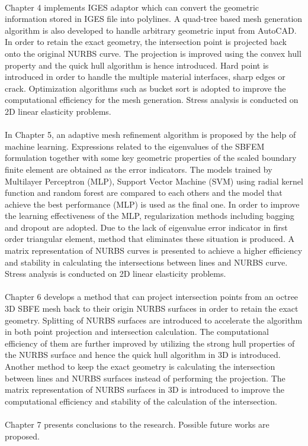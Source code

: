 \paragraph{}
Chapter 4 implements IGES adaptor which can convert the geometric information stored in IGES file into polylines.
A quad-tree based mesh generation algorithm is also developed to handle arbitrary geometric input from AutoCAD.
In order to retain the exact geometry, the intersection point is projected back onto the original NURBS curve.
The projection is improved using the convex hull property and the quick hull algorithm is hence introduced.
Hard point is introduced in order to handle the multiple material interfaces, sharp edges or crack.
Optimization algorithms such as bucket sort is adopted to improve the computational efficiency for the mesh generation.
Stress analysis is conducted on 2D linear elasticity problems.

\paragraph{}
In Chapter 5, an adaptive mesh refinement algorithm is proposed by the help of machine learning.
Expressions related to the eigenvalues of the SBFEM formulation together with some key geometric properties of the scaled boundary finite element are obtained as the error indicators.
The models trained by Multilayer Perceptron (MLP), Support Vector Machine (SVM) using radial kernel function and random forest are compared to each others and the model that achieve the best performance (MLP) is used as the final one.
In order to improve the learning effectiveness of the MLP, regularization methods including bagging and dropout are adopted.
Due to the lack of eigenvalue error indicator in first order triangular element, method that eliminates these situation is produced.
A matrix representation of NURBS curves is presented to achieve a higher efficiency and stability in calculating the intersections between lines and NURBS curve.
Stress analysis is conducted on 2D linear elasticity problems.

\paragraph{}
Chapter 6 develops a method that can project intersection points from an octree 3D SBFE mesh back to their origin NURBS surfaces in order to retain the exact geometry.
Splitting of NURBS surfaces are introduced to accelerate the algorithm in both point projection and intersection calculation.
The computational efficiency of them are further improved by utilizing the strong hull properties of the NURBS surface and hence the quick hull algorithm in 3D is introduced.
Another method to keep the exact geometry is calculating the intersection between lines and NURBS surfaces instead of performing the projection.
The matrix representation of NURBS surfaces in 3D is introduced to improve the computational efficiency and stability of the calculation of the intersection.



\paragraph{}
Chapter 7 presents conclusions to the research.
Possible future works are proposed.